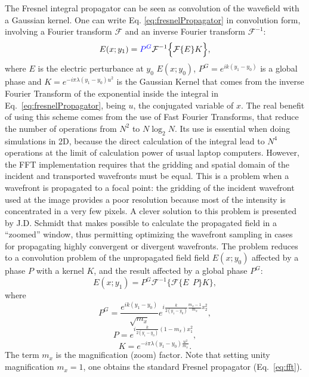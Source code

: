 \documentclass{iucr}
\newcommand{\inblue}[1]{{\color{blue}#1}}
\begin{document}
The Fresnel integral propagator can be seen as convolution of the wavefield with a Gaussian kernel. One can write Eq. \ref{eq:fresnelPropagator} in convolution form, involving \inblue{a Fourier transform $\mathcal{F}$ and an inverse Fourier transform $\mathcal{F}^{-1}$}\cite{goodmanfourier}:
\begin{equation}\label{eq:fft}
E(x; y_1) = \inblue{P^G} \mathcal{F}^{-1}\Big\{ \mathcal{F}\{E\} K \Big\},
\end{equation} 
where \inblue{$E$ is the electric perturbance at $y_0$ $E(x;y_0)$, $P^G=e^{i k (y_1-y_0)}$ is a global phase and $K=e^{-i \pi \lambda (y_1-y_0) u^2}$ is the Gaussian Kernel } that comes from the inverse Fourier Transform of the exponential inside the integral in Eq.~\ref{eq:fresnelPropagator}, being $u$, the conjugated variable of $x$.
The real benefit of using this scheme comes from the use of Fast Fourier Transforms, that reduce the number of operations from $N^2$ to $N \log_2 N$. Its use is essential when doing simulations in 2D, because the direct calculation of the integral lead to $N^4$ operations at the limit of calculation power of usual laptop computers. However, the FFT implementation requires that the gridding and spatial domain of the incident and transported wavefronts must be equal. This is a problem when a wavefront is propagated to a focal point: the gridding of the incident wavefront used at the image provides a poor resolution because most of the intensity is concentrated in a very few pixels. A clever solution to this problem is presented by J.D. Schmidt \cite{schmidt} that makes possible to calculate the propagated field in a ``zoomed'' window, thus permitting optimizing the wavefront sampling in cases for propagating highly convergent or divergent wavefronts. The problem reduces to a convolution problem of the unpropagated field field $E(x;y_0)$ affected by a phase $P$ with a kernel $K$, and the result affected by a global phase $P^G$: 
\begin{equation}
E(x; y_1) = P^G \mathcal{F}^{-1} \Big\{ \mathcal{F} \big\{ E~~P \big\} K \Big\},
\end{equation}
where
\begin{equation}
P^G =  \frac { e^{ik(y_1-y_0) }}{\sqrt{m_x} }e^{i \frac{k}{2 (y_1-y_0)} \frac{m_x - 1}{m_x}x_2^2},
\end{equation}
\begin{equation}
P = e^{i \frac{k}{2(y_1-y_0)} (1-m_x)x_1^2 },
\end{equation}
\begin{equation}
K = e^{-i \pi \lambda (y_1-y_0) \frac{u^2}{m_x} }.
\end{equation}
The term $m_x$ is the magnification (zoom) factor. 
Note that setting unity magnification $m_x=1$, one obtains the standard Fresnel propagator (Eq.~\ref{eq:fft}).
\end{document}
